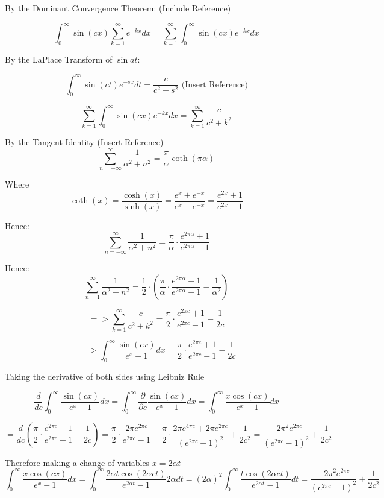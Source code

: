 ﻿\documentclass[a4paper]{article}
\begin{document}
By the Dominant Convergence Theorem: (Include Reference)


$$\int_{0}^{\infty}\sin(cx)\sum\limits_{k=1}^{\infty} e^{-kx}dx
=\sum\limits_{k=1}^{\infty} \int_{0}^{\infty}\sin(cx)e^{-kx} dx
$$

By the LaPlace Transform of $\sin{at}$:

$$\int_{0}^{\infty}\sin(ct)e^{-sx} dt
=\frac{c}{c^2 + s^2} \mbox{  (Insert Reference)}
$$

$$
\sum\limits_{k=1}^{\infty} \int_{0}^{\infty}\sin(cx)e^{-kx} dx
=\sum\limits_{k=1}^{\infty} \frac{c}{c^2+k^2}
$$

By the Tangent Identity (Insert Reference)
$$\sum\limits_{n=-\infty}^{\infty} \frac{1}{\alpha^2+n^2}
=\frac{\pi}{\alpha}\coth(\pi \alpha)$$

Where $$\coth(x)=\frac{\cosh(x)}{\sinh(x)}=\frac{e^{x}+e^{-x}}{e^{x}-e^{-x}}
=\frac{e^{2x}+1}{e^{2x}-1}
$$

Hence:
$$\sum\limits_{n=-\infty}^{\infty} \frac{1}{\alpha^2+n^2}
=\frac{\pi}{\alpha}\cdot\frac{e^{2\pi \alpha}+1}{e^{2\pi \alpha}-1}
$$

Hence:
$$\sum\limits_{n=1}^{\infty} \frac{1}{\alpha^2+n^2}
=\frac{1}{2}\cdot(\frac{\pi}{\alpha}\cdot\frac{e^{2\pi \alpha}+1}{e^{2\pi \alpha}-1} - \frac{1}{\alpha^2})
$$

$$=> 
\sum\limits_{k=1}^{\infty} \frac{c}{c^2+k^2}
=\frac{\pi}{2}\cdot\frac{e^{2\pi c}+1}{e^{2\pi c}-1} - \frac{1}{2c}
$$

$$=>
\int_{0}^{\infty}\frac{\sin(cx)}{e^{x}-1}dx
=\frac{\pi}{2}\cdot\frac{e^{2\pi c}+1}{e^{2\pi c}-1} - \frac{1}{2c}
$$

Taking the derivative of both sides using Leibniz Rule

$$
\frac{d}{dc}\int_{0}^{\infty}\frac{\sin(cx)}{e^{x}-1}dx
=\int_{0}^{\infty}\frac{\partial}{\partial c}\frac{\sin(cx)}{e^{x}-1}dx
=\int_{0}^{\infty}\frac{x\cos(cx)}{e^{x}-1}dx
$$

$$=\frac{d}{dc}(\frac{\pi}{2}\cdot\frac{e^{2\pi c}+1}{e^{2\pi c}-1} - \frac{1}{2c})
= \frac{\pi}{2}\cdot\frac{2\pi e^{2\pi c}}{e^{2\pi c}-1} -\frac{\pi}{2}\cdot\frac{2\pi e^{4\pi c}+2\pi e^{2\pi c}}{(e^{2\pi c}-1)^2} + \frac{1}{2c^2}
= \frac{-2\pi^2e^{2\pi c}}{(e^{2\pi c}-1)^2} + \frac{1}{2c^2}
$$


Therefore making a change of variables $x=2\alpha t$
$$
\int_{0}^{\infty}\frac{x\cos(cx)}{e^{x}-1}dx
=\int_{0}^{\infty}\frac{2\alpha t\cos(2\alpha ct)}{e^{2\alpha t}-1}2\alpha dt
=(2\alpha)^2\int_{0}^{\infty}\frac{t\cos(2\alpha ct)}{e^{2\alpha t}-1}dt
=\frac{-2\pi^2e^{2\pi c}}{(e^{2\pi c}-1)^2} + \frac{1}{2c^2}
$$
\end{document}
